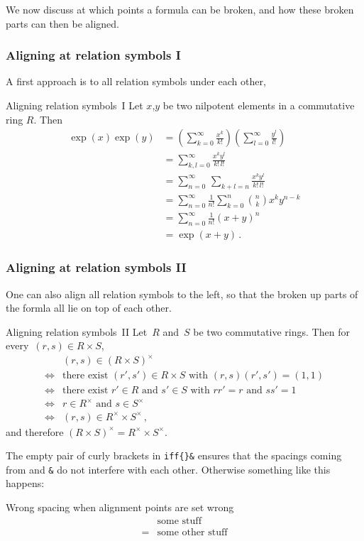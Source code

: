 We now discuss at which points a formula can be broken, and how these broken parts can then be aligned.

\subsubsection{Aligning at relation symbols I}

A first approach is to all relation symbols under each other, 
\begin{showlatex}{Aligning relation symbols~I}
Let $x$,$y$ be two nilpotent elements in a commutative ring $R$.
Then
\begin{align*}
  \exp(x) \exp(y)
  &=
  \left( \sum_{k=0}^\infty \frac{x^k}{k!} \right)
  \left( \sum_{l=0}^\infty \frac{y^l}{l!} \right)
  \\
  &=
  \sum_{k,l=0}^\infty \frac{x^k y^l}{k! \, l!}
  \\
  &=
  \sum_{n=0}^\infty \, \sum_{k+l = n} \frac{x^k y^l}{k! \, l!}
  \\
  &=
  \sum_{n=0}^\infty \frac{1}{n!} \sum_{k=0}^n \binom{n}{k} x^k y^{n-k}
  \\
  &=
  \sum_{n=0}^\infty \frac{1}{n!} (x + y)^n
  \\
  &=
  \exp(x + y) \,.
\end{align*}
\end{showlatex}

\subsubsection{Aligning at relation symbols II}

One can also align all relation symbols to the left, so that the broken up parts of the formla all lie on top of each other.
\begin{showlatex}{Aligning relation symbols~II}
Let~$R$ and~$S$ be two commutative rings.
Then for every~$(r,s) \in R \times S$,
\begin{align*}
  {}&
  (r, s) \in (R \times S)^\times
  \\
  \iff{}&
  \text{there exist $(r', s') \in R \times S$ with $(r,s)(r',s') = (1,1)$}
  \\
  \iff{}&
  \text{there exist $r' \in R$ and $s' \in S$ with $rr' = r$ and $ss' = 1$}
  \\
  \iff{}&
  \text{$r \in R^\times$ and $s \in S^\times$}
  \\
  \iff{}&
  (r,s) \in R^\times \times S^\times \,,
\end{align*}
and therefore $(R \times S)^{\times} = R^\times \times S^\times$.
\end{showlatex}
The empty pair of curly brackets in \texttt{{\tbs}iff\{\}\&} ensures that the spacings coming from  and \texttt{\&} do not interfere with each other.
Otherwise something like this happens:
\begin{showlatex}{Wrong spacing when alignment points are set wrong}
  \begin{align*}
      &\text{some stuff} \\
    =&\text{some other stuff}
  \end{align*}
\end{showlatex}

